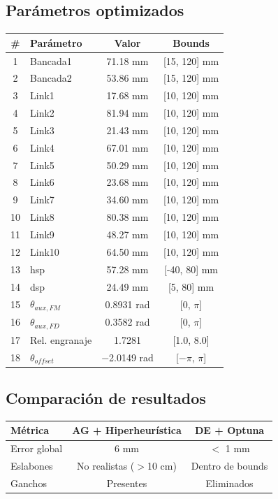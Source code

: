 \documentclass[11pt,letterpaper]{article}
\begin{document}
\subsection{Par\'ametros optimizados}

\begin{tabular}{clcc}
\toprule
\# & Par\'ametro & Valor & Bounds \\
\midrule
1 & Bancada1 & 71.18 mm & [15, 120] mm \\
2 & Bancada2 & 53.86 mm & [15, 120] mm \\
3 & Link1 & 17.68 mm & [10, 120] mm \\
4 & Link2 & 81.94 mm & [10, 120] mm \\
5 & Link3 & 21.43 mm & [10, 120] mm \\
6 & Link4 & 67.01 mm & [10, 120] mm \\
7 & Link5 & 50.29 mm & [10, 120] mm \\
8 & Link6 & 23.68 mm & [10, 120] mm \\
9 & Link7 & 34.60 mm & [10, 120] mm \\
10 & Link8 & 80.38 mm & [10, 120] mm \\
11 & Link9 & 48.27 mm & [10, 120] mm \\
12 & Link10 & 64.50 mm & [10, 120] mm \\
13 & hsp & 57.28 mm & [-40, 80] mm \\
14 & dsp & 24.49 mm & [5, 80] mm \\
15 & $\theta_{aux,FM}$ & 0.8931 rad & [0, $\pi$] \\
16 & $\theta_{aux,FD}$ & 0.3582 rad & [0, $\pi$] \\
17 & Rel. engranaje & 1.7281 & [1.0, 8.0] \\
18 & $\theta_{offset}$ & $-$2.0149 rad & [$-\pi$, $\pi$] \\
\bottomrule
\end{tabular}

\subsection{Comparaci\'on de resultados}
\begin{tabular}{lcc}
\toprule
M\'etrica & AG + Hiperheur\'istica & DE + Optuna \\
\midrule
Error global & 6 mm & $<$ 1 mm \\
Eslabones & No realistas ($>$10 cm) & Dentro de bounds \\
Ganchos & Presentes & Eliminados \\
\bottomrule
\end{tabular}
\end{document}
